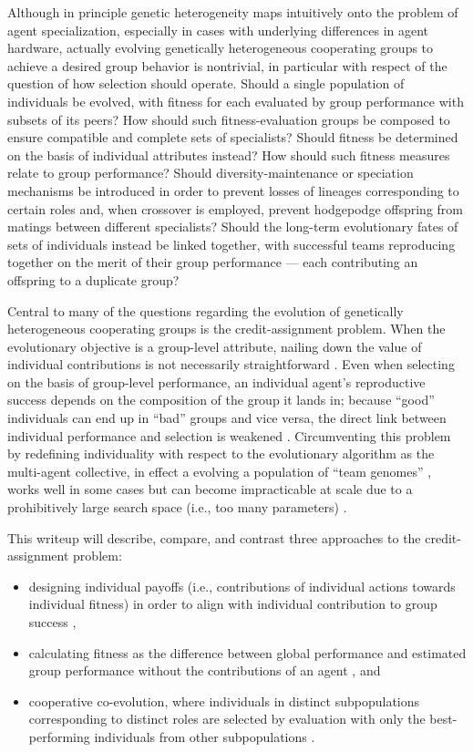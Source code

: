 Although in principle genetic heterogeneity maps intuitively onto the problem of agent specialization, especially in cases with underlying differences in agent hardware, actually evolving genetically heterogeneous cooperating groups to achieve a desired group behavior is nontrivial, in particular with respect of the question of how selection should operate.
Should a single population of individuals be evolved, with fitness for each evaluated by group performance with subsets of its peers?
How should such fitness-evaluation groups be composed to ensure compatible and complete sets of specialists?
Should fitness be determined on the basis of individual attributes instead?
How should such fitness measures relate to group performance?
Should diversity-maintenance or speciation mechanisms be introduced in order to prevent losses of lineages corresponding to certain roles and, when crossover is employed, prevent hodgepodge offspring from matings between different specialists?
Should the long-term evolutionary fates of sets of individuals instead be linked together, with successful teams reproducing together on the merit of their group performance --- each contributing an offspring to a duplicate group?

Central to many of the questions regarding the evolution of genetically heterogeneous cooperating groups is the credit-assignment problem.
When the evolutionary objective is a group-level attribute, nailing down the value of individual contributions is not necessarily straightforward \cite{panait2005cooperative}.
Even when selecting on the basis of group-level performance, an individual agent's reproductive success depends on the composition of the group it lands in; because ``good'' individuals can end up in ``bad'' groups and vice versa, the direct link between individual performance and selection is weakened \cite{waibel2009genetic}.
Circumventing this problem by redefining individuality with respect to the evolutionary algorithm as the multi-agent collective, in effect a evolving a population of ``team genomes'' \cite{waibel2009genetic}, works well in some cases \cite{miconi2003evolving,bongard2000legion} but can become impracticable at scale due to a prohibitively large search space (i.e., too many parameters) \cite{agogino2008efficient}.

This writeup will describe, compare, and contrast three approaches to the credit-assignment problem:
\begin{itemize}
  \item designing individual payoffs (i.e., contributions of individual actions towards individual fitness) in order to align with individual contribution to group success \cite{waibel2009genetic},
  \item calculating fitness as the difference between global performance and estimated group performance without the contributions of an agent \cite{knudson2010coevolution}, and
  \item cooperative co-evolution, where individuals in distinct subpopulations corresponding to distinct roles are selected by evaluation with only the best-performing individuals from other subpopulations \cite{gomes2015cooperative}.
\end{itemize}
